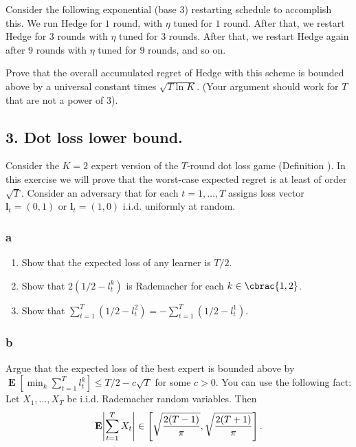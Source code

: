 \documentclass[10pt, a4paper, twoside]{amsart}
\theoremstyle{plain}
\DeclarePairedDelimiter\abs{\lvert}{\rvert}
\DeclarePairedDelimiter\cbrac\{\}
\newcommand{\Ev}{\operatorname*{\ensuremath{\mathbf{E}}}} %
\begin{document}
Consider the following exponential (base $3$) restarting schedule to accomplish this. We run Hedge for $1$ round, with $\eta$ tuned for $1$ round. After that, we restart Hedge for $3$ rounds with $\eta$ tuned for $3$ rounds. After that, we restart Hedge again after $9$ rounds with $\eta$ tuned for $9$ rounds, and so on.

Prove that the overall accumulated regret of Hedge with this scheme is bounded above by a universal constant times $\sqrt{T \ln K}$. (Your argument should work for $T$ that are not a power of $3$).

\subsection*{3. Dot loss lower bound.}
Consider the $K = 2$ expert version of the $T$-round dot loss game (Definition ). In this exercise we will prove that the worst-case expected regret is at least of order $\sqrt{T}$. Consider an adversary that for each $t = 1, \ldots, T$ assigns loss vector $\mathbf{l}_t = (0,1)$ or $\mathbf{l}_t = (1,0)$ i.i.d. uniformly at random.
\subsubsection*{a}
\begin{enumerate}[i]
    \item Show that the expected loss of any learner is $T/2$.
    \item Show that $2(1/2 - l^k_t)$ is Rademacher for each $k \in \cbrac{1,2}$.
    \item Show that $\sum_{t=1}^T (1/2 - l_t^2) = - \sum_{t=1}^T(1/2 - l_t^1)$.
\end{enumerate}
\subsubsection*{b} Argue that the expected loss of the best expert is bounded above by \\ 
$\Ev \left[ \min_k \sum_{t=1}^T l_t^k \right] \leq T/2 - c \sqrt{T}$ for some $c>0$. You can use the following fact: Let $X_1, \ldots , X_T$ be i.i.d. Rademacher random variables. Then
\begin{equation*}
    \Ev \abs*{\sum_{t=1}^T X_t} \in \left[ \sqrt{\frac{2(T-1)}{\pi}}, \sqrt{\frac{2(T+1)}{\pi}} \right].
\end{equation*}
\end{document}
